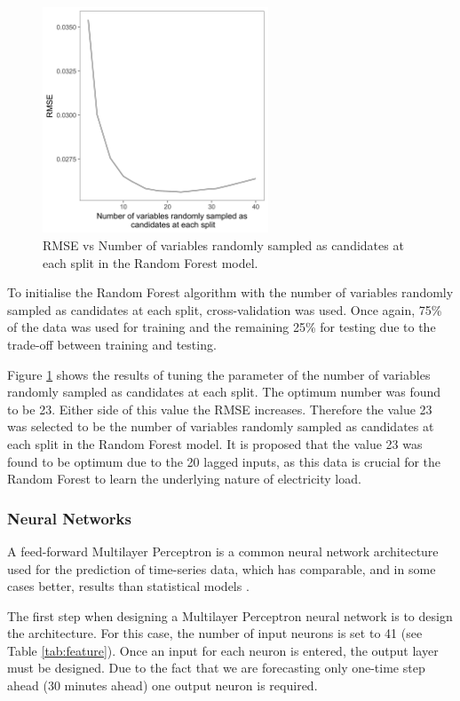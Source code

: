 \begin{figure}
	\centering
	\includegraphics[width=0.6\textwidth]{Chapter5/figures/short-term-forecasting/rforest_parameter_tuning}
	\caption{RMSE vs Number of variables randomly sampled as candidates at each split in the Random Forest model.}
	\label{fig:rf_param_tune}
\end{figure}

To initialise the Random Forest algorithm with the number of variables randomly sampled as candidates at each split, cross-validation was used. Once again, 75\% of the data was used for training and the remaining 25\% for testing due to the trade-off between training and testing.

Figure \ref{fig:rf_param_tune} shows the results of tuning the parameter of the number of variables randomly sampled as candidates at each split. The optimum number was found to be 23. Either side of this value the RMSE increases. Therefore the value 23 was selected to be the number of variables randomly sampled as candidates at each split in the Random Forest model. It is proposed that the value 23 was found to be optimum due to the 20 lagged inputs, as this data is crucial for the Random Forest to learn the underlying nature of electricity load.


\subsubsection{Neural Networks}

A feed-forward Multilayer Perceptron is a common neural network architecture used for the prediction of time-series data, which has comparable, and in some cases better, results than statistical models \cite{Hill1994}. 

The first step when designing a Multilayer Perceptron neural network is to design the architecture. For this case, the number of input neurons is set to 41 (see Table \ref{tab:feature}). Once an input for each neuron is entered, the output layer must be designed. Due to the fact that we are forecasting only one-time step ahead (30 minutes ahead) one output neuron is required.

